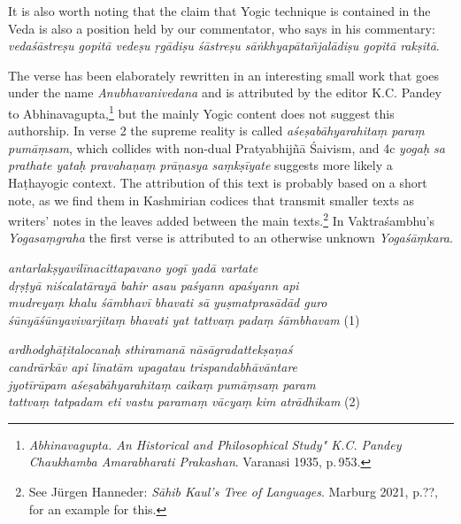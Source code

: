 \begin{ekdosis}
\begin{philcomm}[hp01_001]
    It is also worth noting that the claim that Yogic technique is contained in the Veda is also a
    position held by our commentator, who says in his commentary: \emph{vedaśāstreṣu gopitā vedeṣu
      ṛgādiṣu śāstreṣu sāṅkhyapātañjalādiṣu gopitā rakṣitā}. 

    The verse has been elaborately rewritten in an interesting small work that goes under the name
    \emph{Anubhavanivedana} and is attributed by the editor K.C. Pandey to
    Abhinavagupta,\footnote{\emph{Abhinavagupta. An Historical and Philosophical Study" K.C. Pandey
        Chaukhamba Amarabharati Prakashan}. Varanasi 1935, p.\,953.} but the mainly Yogic content does
    not suggest this authorship. In verse 2 the supreme reality is called \emph{aśeṣabāhyarahitaṃ paraṃ
      pumāṃsam}, which collides with non-dual Pratyabhijñā Śaivism, and 4c \emph{yogaḥ sa prathate
      yataḥ pravahaṇaṃ prāṇasya saṃkṣīyate} suggests more likely a Haṭhayogic context. The attribution
    of this text is probably based on a short note, as we find them in Kashmirian codices that transmit
    smaller texts as writers' notes in the leaves added between the main texts.\footnote{See Jürgen
      Hanneder: \emph{Sāhib Kaul's Tree of Languages}. Marburg 2021, p.??, for an example for this.}
    In Vaktraśambhu's \emph{Yogasaṃgraha} the first verse is attributed to an otherwise unknown
    \emph{Yogaśāṃkara}. 

    \begin{ekdverse}
      \emph{antarlakṣyavilīnacittapavano yogī yadā vartate}\\
      \emph{dṛṣṭyā niścalatārayā bahir asau paśyann apaśyann api}\\
      \emph{mudreyaṃ khalu śāmbhavī bhavati sā yuṣmatprasādād guro}\\
      \emph{śūnyāśūnyavivarjitaṃ bhavati yat tattvaṃ padaṃ śāmbhavam} (1)\\
    \end{ekdverse}

    \begin{ekdverse}
      \emph{ardhodghāṭitalocanaḥ sthiramanā nāsāgradattekṣaṇaś}\\
      \emph{candrārkāv api līnatām upagatau trispandabhāvāntare}\\
      \emph{jyotīrūpam aśeṣabāhyarahitaṃ caikaṃ pumāṃsaṃ param}\\
      \emph{tattvaṃ tatpadam eti vastu paramaṃ vācyaṃ kim atrādhikam} (2)\\
    \end{ekdverse}


\end{philcomm}
\end{ekdosis}
